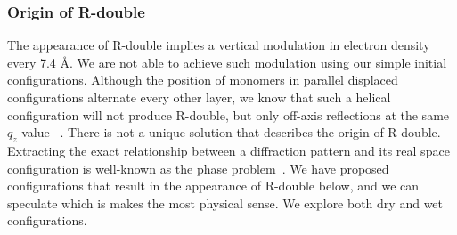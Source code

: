 \documentclass[journal=jpcbfk,manuscript=article]{achemso}
\begin{document}
  \subsubsection{Origin of R-double}\label{section:rdouble}
  
  
  The appearance of R-double implies a vertical modulation in electron density every 7.4 \AA.
  We are not able to achieve such modulation using our simple initial configurations. Although
  the position of monomers in parallel displaced configurations alternate every other layer, 
  we know that such a helical configuration will not produce R-double, but only off-axis 
  reflections at the same $q_z$ value ~\cite{harburn_atlas_1975}. There is not a unique solution
  that describes the origin of R-double. Extracting the exact relationship between a diffraction
  pattern and its real space configuration is well-known as the phase problem~\cite{taylor_phase_2003}.    
  We have proposed configurations that result in the appearance of R-double below, and we can 
  speculate which is makes the most physical sense. We explore both dry and wet configurations.
 
\end{document}
